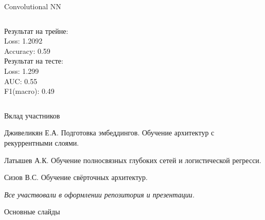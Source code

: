 \documentclass[c, aspectratio = 43]{beamer}
\begin{document}
\begin{frame}{Convolutional NN}
\begin{columns}
\begin{column}{0.5\textwidth}
                Результат на трейне:\\
                Loss: 1.2092\\
                Accuracy: 0.59\\

                Результат на тесте:\\
                Loss: 1.299\\
                AUC: 0.55\\
                F1(macro): 0.49\\
            \end{column}

        \end{columns}


    \end{frame}

\begin{frame}{Вклад участников}
	
	\begin{block}{Дживеликян Е.А.}
		Подготовка эмбеддингов. Обучение архитектур с рекуррентными слоями.
	\end{block}
	
	\begin{block}{Латышев А.К.}
		Обучение полносвязных глубоких сетей и логистической регресси.
	\end{block}
	
	\begin{block}{Сизов В.С.}
		Обучение свёрточных архитектур. 
	\end{block}

	\vfill
	\textit{Все участвовали в оформлении репозитория и презентации.}

\end{frame}



\beamertemplatenavigationsymbolsempty
\begin{frame}[noframenumbering]{Основные слайды}
	\hypertarget{toc}{}
	\tableofcontents[part=1]
\end{frame}
\end{document}
